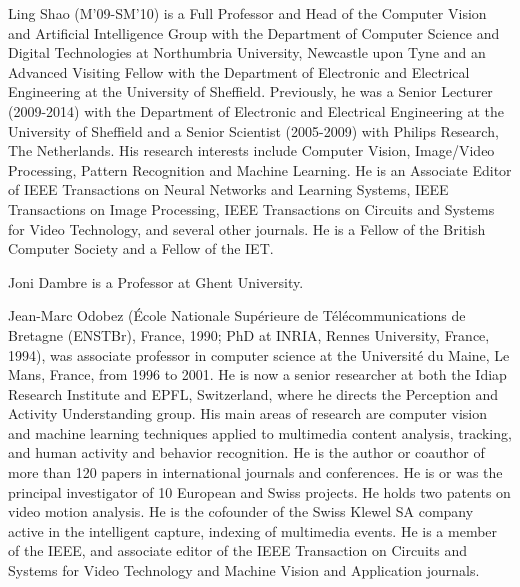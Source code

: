 \begin{IEEEbiography}{Ling Shao}
(M'09-SM'10) is a Full Professor and Head of the Computer Vision and Artificial Intelligence Group with the Department of Computer Science and Digital Technologies at Northumbria University, Newcastle upon Tyne and an Advanced Visiting Fellow with the Department of Electronic and Electrical Engineering at the University of Sheffield. Previously, he was a Senior Lecturer (2009-2014) with the Department of Electronic and Electrical Engineering at the University of Sheffield and a Senior Scientist (2005-2009) with Philips Research, The Netherlands. His research interests include Computer Vision, Image/Video Processing, Pattern Recognition and Machine Learning. He is an Associate Editor of IEEE Transactions on Neural Networks and Learning Systems, IEEE Transactions on Image Processing, IEEE Transactions on Circuits and Systems for Video Technology, and several other journals.  He is a Fellow of the British Computer Society and a Fellow of the IET.
\end{IEEEbiography}


\begin{IEEEbiographynophoto}{ Joni Dambre}
is a Professor at Ghent University.
\end{IEEEbiographynophoto}

\begin{IEEEbiography}{Jean-Marc Odobez}
(\'Ecole Nationale Sup\'erieure de T\'el\'ecommunications de Bretagne (ENSTBr), France, 1990;
PhD at INRIA, Rennes University, France, 1994),
was associate professor in computer science at the  Universit\'e du Maine, Le Mans, France, from 1996 to 2001.
He is now a senior researcher at both the Idiap Research Institute and
EPFL, Switzerland, where he directs the Perception and Activity Understanding group.
His main areas of research are computer vision and machine learning
techniques applied to multimedia content analysis, tracking,
and human activity and behavior recognition. He is the author or
coauthor of more than 120 papers in international journals and
conferences. He is or was the principal investigator of 10
European and Swiss projects. He holds two patents on video motion
analysis. He is the cofounder of the Swiss Klewel SA company active in
the intelligent capture, indexing of multimedia events. He is a member of the IEEE, and associate
editor of the IEEE Transaction on Circuits and Systems for Video Technology and Machine Vision and Application journals.
\end{IEEEbiography}





\endinput
